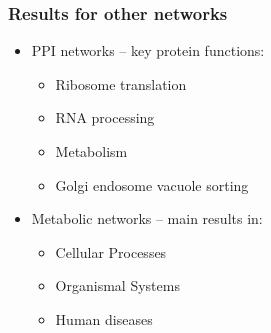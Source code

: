 \documentclass[11pt,xcolor=table]{beamer}
\newcommand{\hilight}[1]{\colorbox{yellow}{#1}}
\begin{document}
%   
%     
% 
% 
%   
%   

\begin{frame}
  \frametitle{Results for other networks}
  
  \begin{itemize}
    \item PPI networks -- key protein functions: \vfill
    \begin{itemize}
      \item Ribosome translation \vfill
      \item RNA processing \vfill
      \item Metabolism \vfill
      \item Golgi endosome vacuole sorting \vfill
    \end{itemize}
    \item Metabolic networks -- main results in: \vfill
    \begin{itemize}
      \item Cellular Processes \vfill
      \item Organismal Systems \vfill
      \item Human diseases \vfill
    \end{itemize}
 \end{itemize}
  
  
\end{frame}
\end{document}
